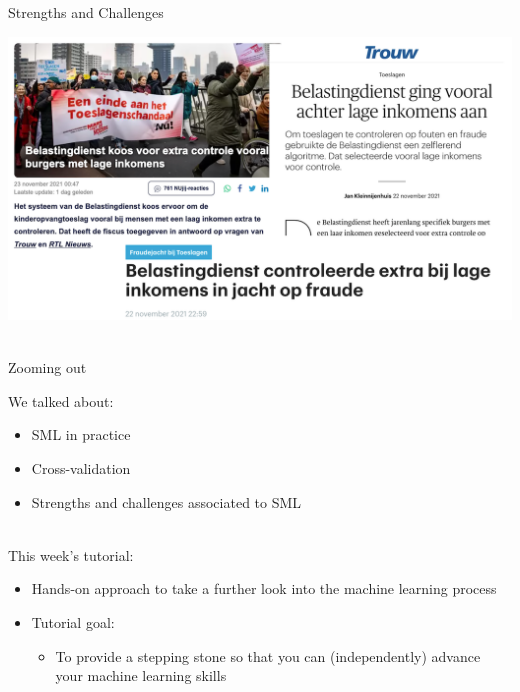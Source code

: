 \documentclass[handout]{beamer}
\begin{document}
\begin{frame}{Strengths and Challenges}
	
	\begin{center}
		\includegraphics[width=\linewidth,height=\textheight,keepaspectratio]{../pictures/toeslagenaffaire_headlines.png} \\\
	\end{center}
	
	
\end{frame}


\begin{frame}{Zooming out} 
	
	We talked about:
	\begin{itemize}
		\item SML in practice
		\item Cross-validation
		\item Strengths and challenges associated to SML \\\
\end{itemize}
	
This week's tutorial:
	\begin{itemize}
		\item Hands-on approach to take a further look into the machine learning process
		\item Tutorial goal:
		\begin{itemize}
			\item To provide a stepping stone so that you can (independently) advance your machine learning skills
		\end{itemize}
		
	\end{itemize}
	
\end{frame}
\end{document}
